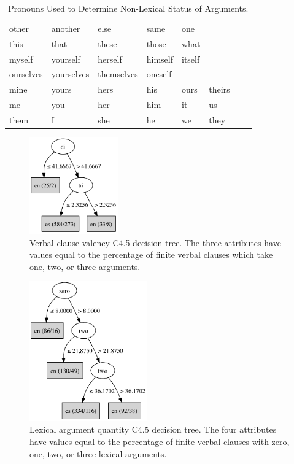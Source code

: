 \documentclass[main.tex]{subfiles}
\begin{document}
\begin{table}[ht]
\small
\centering
\caption{Pronouns Used to Determine Non-Lexical Status of Arguments.}
\begin{tabular}{ l l l l l l l l }
\toprule

other & another & else & same & one \\
this & that & these & those & what \\
myself & yourself & herself & himself & itself \\
ourselves & yourselves &themselves & oneself \\
mine & yours & hers & his & ours & theirs \\
me & you & her & him & it & us \\
them & I & she & he & we & they \\

\bottomrule
\end{tabular}
\label{table:pronouns}
\end{table}


\begin{figure}[ht]
\centering
\caption{Verbal clause valency C4.5 decision tree. The three attributes have values equal to the percentage of finite verbal clauses which take one, two, or three arguments.}
\label{fig:c4.5-val}
\includegraphics[width=1.5in]{c45-val.pdf}
\end{figure}

\begin{figure}[ht]
\centering
\caption{Lexical argument quantity C4.5 decision tree. The four attributes have values equal to the percentage of finite verbal clauses with zero, one, two, or three lexical arguments.}
\label{fig:c4.5-num-lex}
\includegraphics[width=2in]{c45-num-lex.pdf}
\end{figure}
\end{document}
